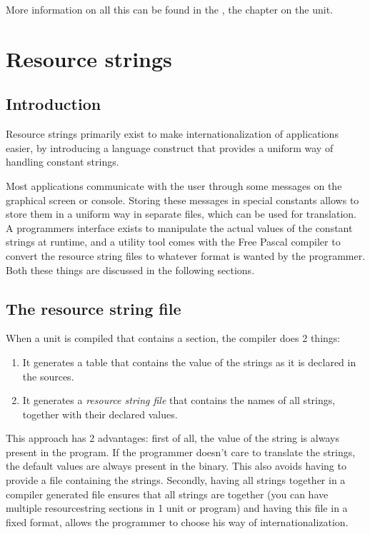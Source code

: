 More information on all this can be found in the \unitsref, the chapter on
the  unit.



\chapter{Resource strings}
\label{resourcestrings}
\section{Introduction}
Resource strings primarily exist to make internationalization of
applications easier, by introducing a language construct that provides
a uniform way of handling constant strings.

Most applications communicate with the user through some messages on the
graphical screen or console. Storing these messages in special constants
allows to store them in a uniform way in separate files, which can be used
for translation. A programmers interface exists to manipulate the actual
values of the constant strings at runtime, and a utility tool comes with the
Free Pascal compiler to convert the resource string files to whatever format
is wanted by the programmer. Both these things are discussed in the
following sections.

\section{The resource string file}
When a unit is compiled that contains a  section,
the compiler does 2 things:
\begin{enumerate}
\item It generates a table that contains the value of the strings as it
is declared in the sources.
\item It generates a {\em resource string file} that contains the names
of all strings, together with their declared values.
\end{enumerate}
This approach has 2 advantages: first of all, the value of the string is
always present in the program. If the programmer doesn't care to translate
the strings, the default values are always present in the binary. This also
avoids having to provide a file containing the strings. Secondly, having all
strings together in a compiler generated file ensures that all strings are
together (you can have multiple resourcestring sections in 1 unit or program)
and having this file in a fixed format, allows the programmer to choose his
way of internationalization.

